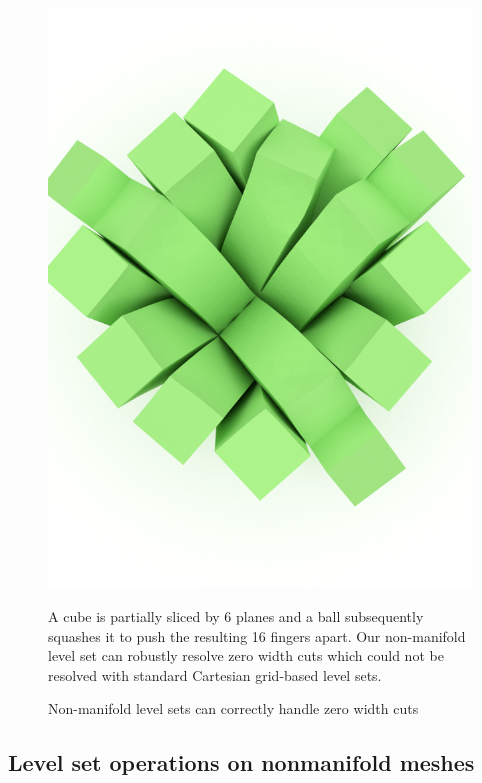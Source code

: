 \begin{figure}
\includegraphics[width=.46\columnwidth]{chapter_nonmanifoldlevelsets/images/ball_drop_zero_width_160.png}
\vspace*{-.1in}
\caption{Non-manifold level sets can correctly handle zero width cuts}{A cube is partially sliced by 6 planes and a ball
  subsequently squashes it to push the resulting 16 fingers apart. Our
  non-manifold level set can robustly resolve zero width cuts which
  could not be resolved with standard Cartesian grid-based level sets.}
\label{fig:zero-width}
\vspace*{-.2in}
\end{figure}



\subsection{Level set operations on nonmanifold meshes}


